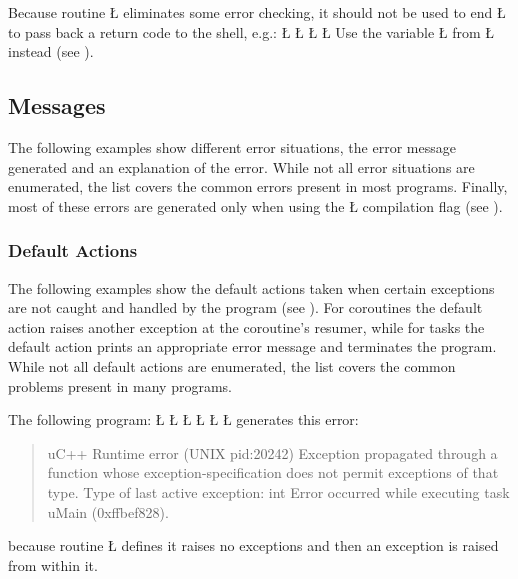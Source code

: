 \documentclass[openright,twoside]{report}
\begin{document}
\begin{annotation}
Because routine \LGinlinetrue\LGbegin\lgrinde\L{}\endlgrinde\LGend{} eliminates some error checking, it should not be used to end \LGinlinetrue\LGbegin\lgrinde\L{}\endlgrinde\LGend{} to pass back a return code to the shell, e.g.:
\LGinlinefalse\LGbegin\lgrinde
\L{}
\L{\LB{}}
\L{\LB{}}
\L{\LB{\}}}
\endlgrinde\LGend
Use the variable \LGinlinetrue\LGbegin\lgrinde\L{}\endlgrinde\LGend{} from \LGinlinetrue\LGbegin\lgrinde\L{}\endlgrinde\LGend{} instead (see ).
\end{annotation}


\subsection{Messages}

The following examples show different error situations, the error message generated and an explanation of the error.
While not all error situations are enumerated, the list covers the common errors present in most \uC programs.
Finally, most of these errors are generated only when using the \LGinlinetrue\LGbegin\lgrinde\L{}\endlgrinde\LGend{} compilation flag (see ).


\subsubsection{Default Actions}
\label{s:DefaultActions}

The following examples show the default actions taken when certain exceptions are not caught and handled by the program (see ).
For coroutines the default action raises another exception at the coroutine's resumer, while for tasks the default action prints an appropriate error message and terminates the program.
While not all default actions are enumerated, the list covers the common problems present in many \uC programs.

The following program:
\LGinlinefalse\LGbegin\lgrinde
\L{}
\CE{}\L{\LB{}}
\L{\LB{\}}}
\L{}
\L{\LB{}}
\L{\LB{\}}}
\endlgrinde\LGend
generates this error:
\begin{quote}
\BGfont
uC++ Runtime error (UNIX pid:20242) Exception propagated through a function whose exception-specification does not permit exceptions of that type.
Type of last active exception: int
Error occurred while executing task uMain (0xffbef828).
\end{quote}
because routine \LGinlinetrue\LGbegin\lgrinde\L{}\endlgrinde\LGend{} defines it raises no exceptions and then an exception is raised from within it.
\end{document}
